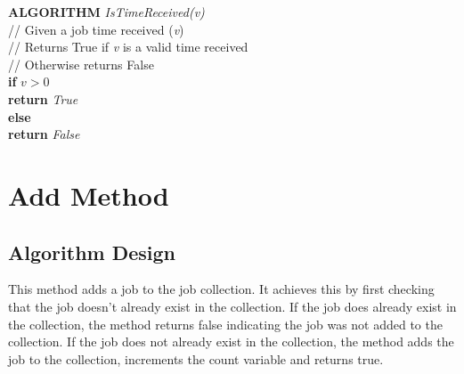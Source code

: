 \documentclass[12pt,a4paper]{article}
\begin{document}
			\textbf{ALGORITHM} \textit{IsTimeReceived(v)}\\
			\null\hspace{1cm}// Given a job time received (\textit{v})\\
			\null\hspace{1cm}// Returns True if \textit{v} is a valid time received\\
			\null\hspace{1cm}// Otherwise returns False\\
			\null\hspace{1cm}\textbf{if} \textit{$v > 0$}\\
			\null\hspace{2cm}\textbf{return} \textit{True}\\
			\null\hspace{1cm}\textbf{else}\\
			\null\hspace{2cm}\textbf{return} \textit{False}
		
	\newpage
			
	\section{Add Method}
		\subsection{Algorithm Design}
			This method adds a job to the job collection. It achieves this by first checking that the job 
			doesn't already exist in the collection. If the job does already exist in the collection, the 
			method returns false indicating the job was not added to the collection. If the job does not 
			already exist in the collection, the method adds the job to the collection, increments the count 
			variable and returns true.\\
\end{document}
